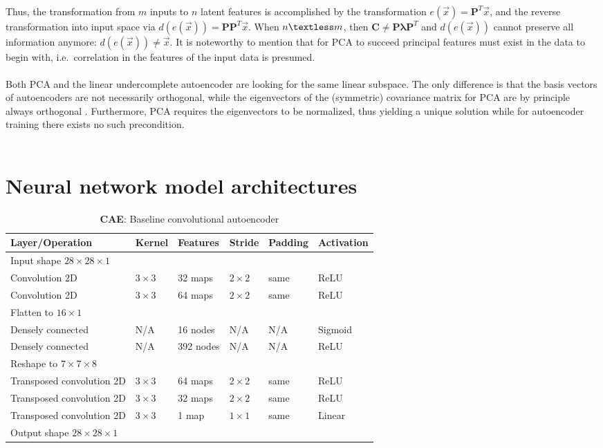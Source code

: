 \documentclass[a4paper, 12pt, twoside]{article}
\begin{document}
\begin{appendices}
\begin{gather}
\end{gather}
Thus, the transformation from $m$ inputs to $n$ latent features is accomplished by the transformation $e(\vec{x})=\textbf{P}^T\vec{x}$, and the reverse transformation into input space via $d(e(\vec{x}))=\textbf{P}\textbf{P}^T\vec{x}$. When $n\textless m$, then $\textbf{C}\neq \textbf{P}\bm{\lambda}\textbf{P}^T$ and $d(e(\vec{x}))$ cannot preserve all information anymore: $d(e(\vec{x}))\neq \vec{x}$. It is noteworthy to mention that for PCA to succeed principal features must exist in the data to begin with, i.e.~correlation in the features of the input data is presumed.\\
\\
Both PCA and the linear undercomplete autoencoder are looking for the same linear subspace. The only difference is that the basis vectors of autoencoders are not necessarily orthogonal, while the eigenvectors of the (symmetric) covariance matrix for PCA are by principle always orthogonal \cite{Goodfellow16}. Furthermore, PCA requires the eigenvectors to be normalized, thus yielding a unique solution while for autoencoder training there exists no such precondition.\\
\\

	\section{Neural network model architectures}\label{app:nn_arch}

		\begin{table}[H]
			\centering
				\caption{\textbf{CAE}: Baseline convolutional autoencoder}
			\begin{tabular}{ l | l | l | l | l | l}
				\textbf{Layer/Operation} & \textbf{Kernel} & \textbf{Features} & \textbf{Stride} & \textbf{Padding} & \textbf{Activation}\\
				\hline
				\multicolumn{3}{l}{Input shape $28\times28\times1$}\\
				\hline
				Convolution 2D & $3\times3$ & 32 maps & $2\times2$ & same & ReLU \\
				Convolution 2D & $3\times3$ & 64 maps & $2\times2$ & same & ReLU \\
				Flatten to $16\times1$\\
				Densely connected & N/A & 16 nodes & N/A & N/A & Sigmoid \\
				\hline
				Densely connected & N/A & 392 nodes & N/A & N/A & ReLU \\
				Reshape to $7\times7\times8$ \\
				Transposed convolution 2D & $3\times3$ & 64 maps & $2\times2$ & same & ReLU \\
				Transposed convolution 2D & $3\times3$ & 32 maps & $2\times2$ & same & ReLU \\
				Transposed convolution 2D & $3\times3$ & 1 map & $1\times1$ & same & Linear \\
				\hline
				\multicolumn{3}{l}{Output shape $28\times28\times1$} \\
				\hline
			\end{tabular}
		\end{table}


\end{appendices}
\end{document}
